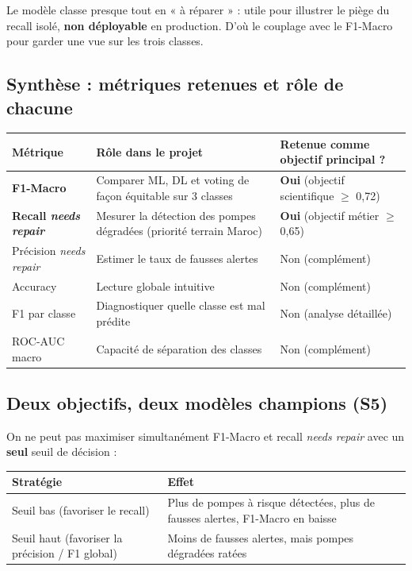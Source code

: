 \documentclass[11pt,a4paper]{report}
\begin{document}
Le modèle classe presque tout en « à réparer » : utile pour illustrer le piège du recall isolé, \textbf{non déployable} en production. D'où le couplage avec le F1-Macro pour garder une vue sur les trois classes.

\subsection{Synthèse : métriques retenues et rôle de chacune}

{\small
\begin{longtable}{@{}>{\raggedright\arraybackslash}p{}>{\raggedright\arraybackslash}p{}>{\raggedright\arraybackslash}p{}@{}}
\toprule
\rowcolor{EHTPTableHead}Métrique & Rôle dans le projet & Retenue comme objectif principal ? \\
\midrule
\textbf{F1-Macro} & Comparer ML, DL et voting de façon équitable sur 3 classes & \textbf{Oui} (objectif scientifique $\geq$ 0,72) \\
\textbf{Recall \textit{needs repair}} & Mesurer la détection des pompes dégradées (priorité terrain Maroc) & \textbf{Oui} (objectif métier $\geq$ 0,65) \\
Précision \textit{needs repair} & Estimer le taux de fausses alertes & Non (complément) \\
Accuracy & Lecture globale intuitive & Non (complément) \\
F1 par classe & Diagnostiquer quelle classe est mal prédite & Non (analyse détaillée) \\
ROC-AUC macro & Capacité de séparation des classes & Non (complément) \\
\bottomrule
\end{longtable}
}

\subsection{Deux objectifs, deux modèles champions (S5)}

On ne peut pas maximiser simultanément F1-Macro et recall \textit{needs repair} avec un \textbf{seul} seuil de décision :

{\small
\begin{longtable}{@{}>{\raggedright\arraybackslash}p{}>{\raggedright\arraybackslash}p{}@{}}
\toprule
\rowcolor{EHTPTableHead}Stratégie & Effet \\
\midrule
Seuil bas (favoriser le recall) & Plus de pompes à risque détectées, plus de fausses alertes, F1-Macro en baisse \\
Seuil haut (favoriser la précision / F1 global) & Moins de fausses alertes, mais pompes dégradées ratées \\
\bottomrule
\end{longtable}
}
\end{document}
